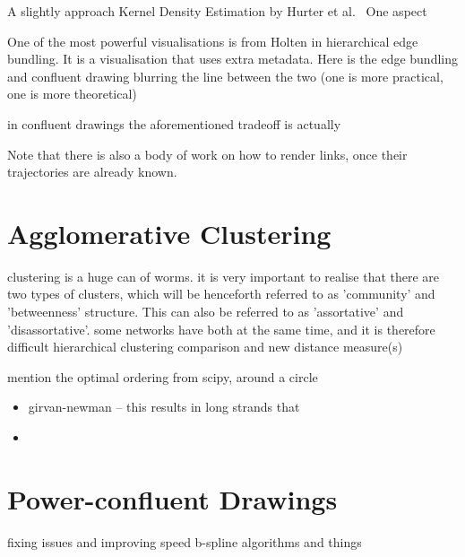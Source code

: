 A slightly approach Kernel Density Estimation by Hurter et al.~\cite{TODO} 
One aspect 

One of the most powerful visualisations is from Holten in hierarchical edge bundling. It is a visualisation that uses extra metadata. Here is the 
edge bundling and confluent drawing
blurring the line between the two (one is more practical, one is more theoretical)


in confluent drawings the aforementioned tradeoff is actually 

Note that there is also a body of work on how to render links, once their trajectories are already known.


\section{Agglomerative Clustering}
clustering is a huge can of worms.
it is very important to realise that there are two types of clusters, which will be henceforth referred to as 'community' and 'betweenness' structure. This can also be referred to as 'assortative' and 'disassortative'.
some networks have both at the same time, and it is therefore difficult 
hierarchical clustering comparison and new distance measure(s)

mention the optimal ordering from scipy, around a circle

\begin{itemize}
    \item girvan-newman -- this results in long strands that \item
\end{itemize}

\section{Power-confluent Drawings}
fixing issues and improving speed
b-spline algorithms and things